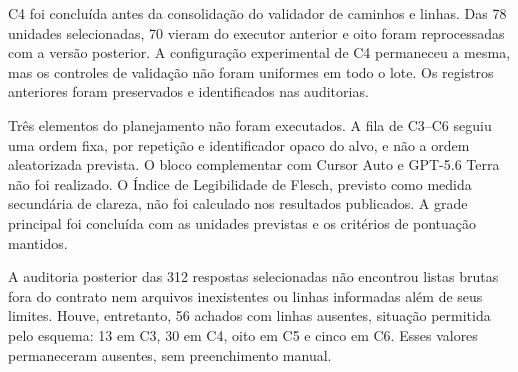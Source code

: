 C4 foi concluída antes da consolidação do validador de caminhos e linhas. Das 78 unidades selecionadas, 70 vieram do executor anterior e oito foram reprocessadas com a versão posterior. A configuração experimental de C4 permaneceu a mesma, mas os controles de validação não foram uniformes em todo o lote. Os registros anteriores foram preservados e identificados nas auditorias.

Três elementos do planejamento não foram executados. A fila de C3--C6 seguiu uma ordem fixa, por repetição e identificador opaco do alvo, e não a ordem aleatorizada prevista. O bloco complementar com Cursor Auto e GPT-5.6 Terra não foi realizado. O Índice de Legibilidade de Flesch, previsto como medida secundária de clareza, não foi calculado nos resultados publicados. A grade principal foi concluída com as unidades previstas e os critérios de pontuação mantidos.

A auditoria posterior das 312 respostas selecionadas não encontrou listas brutas fora do contrato nem arquivos inexistentes ou linhas informadas além de seus limites. Houve, entretanto, 56 achados com linhas ausentes, situação permitida pelo esquema: 13 em C3, 30 em C4, oito em C5 e cinco em C6. Esses valores permaneceram ausentes, sem preenchimento manual.
